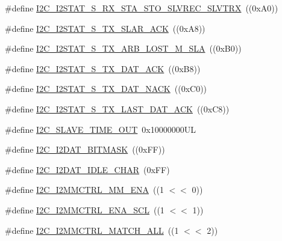 \begin{DoxyCompactItemize}
\#define \hyperlink{group__I2C__17XX__40XX_ga7afe9f0e54aeb9ce8428c0adeb3c3274}{I2\-C\-\_\-\-I2\-S\-T\-A\-T\-\_\-\-S\-\_\-\-R\-X\-\_\-\-S\-T\-A\-\_\-\-S\-T\-O\-\_\-\-S\-L\-V\-R\-E\-C\-\_\-\-S\-L\-V\-T\-R\-X}~((0x\-A0))
\item 
\#define \hyperlink{group__I2C__17XX__40XX_gae6dcbdd1f01f7ebf3595722770e3b7b6}{I2\-C\-\_\-\-I2\-S\-T\-A\-T\-\_\-\-S\-\_\-\-T\-X\-\_\-\-S\-L\-A\-R\-\_\-\-A\-C\-K}~((0x\-A8))
\item 
\#define \hyperlink{group__I2C__17XX__40XX_gac71ac23a80e1bdb700a2c37170031107}{I2\-C\-\_\-\-I2\-S\-T\-A\-T\-\_\-\-S\-\_\-\-T\-X\-\_\-\-A\-R\-B\-\_\-\-L\-O\-S\-T\-\_\-\-M\-\_\-\-S\-L\-A}~((0x\-B0))
\item 
\#define \hyperlink{group__I2C__17XX__40XX_gaeb92fe85cc3f6c813cb91685234ac08c}{I2\-C\-\_\-\-I2\-S\-T\-A\-T\-\_\-\-S\-\_\-\-T\-X\-\_\-\-D\-A\-T\-\_\-\-A\-C\-K}~((0x\-B8))
\item 
\#define \hyperlink{group__I2C__17XX__40XX_gad9cdcd8c06924252a2ad9baced97d838}{I2\-C\-\_\-\-I2\-S\-T\-A\-T\-\_\-\-S\-\_\-\-T\-X\-\_\-\-D\-A\-T\-\_\-\-N\-A\-C\-K}~((0x\-C0))
\item 
\#define \hyperlink{group__I2C__17XX__40XX_ga3e4522387958da1da6017a6e48a0daad}{I2\-C\-\_\-\-I2\-S\-T\-A\-T\-\_\-\-S\-\_\-\-T\-X\-\_\-\-L\-A\-S\-T\-\_\-\-D\-A\-T\-\_\-\-A\-C\-K}~((0x\-C8))
\item 
\#define \hyperlink{group__I2C__17XX__40XX_ga33116b352c72ef28879812c66387f17a}{I2\-C\-\_\-\-S\-L\-A\-V\-E\-\_\-\-T\-I\-M\-E\-\_\-\-O\-U\-T}~0x10000000\-U\-L
\item 
\#define \hyperlink{group__I2C__17XX__40XX_gac66b7c81c93cc59f69d204b4eb7d639b}{I2\-C\-\_\-\-I2\-D\-A\-T\-\_\-\-B\-I\-T\-M\-A\-S\-K}~((0x\-F\-F))
\item 
\#define \hyperlink{group__I2C__17XX__40XX_ga5b04af302e0e4007df123dff0328ac5e}{I2\-C\-\_\-\-I2\-D\-A\-T\-\_\-\-I\-D\-L\-E\-\_\-\-C\-H\-A\-R}~(0x\-F\-F)
\item 
\#define \hyperlink{group__I2C__17XX__40XX_ga8dc8fa566a5113c3e1b35c0580d90d9f}{I2\-C\-\_\-\-I2\-M\-M\-C\-T\-R\-L\-\_\-\-M\-M\-\_\-\-E\-N\-A}~((1 $<$$<$ 0))
\item 
\#define \hyperlink{group__I2C__17XX__40XX_gabf11567c27c48d795ba0f92cf636dab6}{I2\-C\-\_\-\-I2\-M\-M\-C\-T\-R\-L\-\_\-\-E\-N\-A\-\_\-\-S\-C\-L}~((1 $<$$<$ 1))
\item 
\#define \hyperlink{group__I2C__17XX__40XX_gac7dd5efba503dd79c6b42f3575f70307}{I2\-C\-\_\-\-I2\-M\-M\-C\-T\-R\-L\-\_\-\-M\-A\-T\-C\-H\-\_\-\-A\-L\-L}~((1 $<$$<$ 2))
\item 
$$
\end{DoxyCompactItemize}
